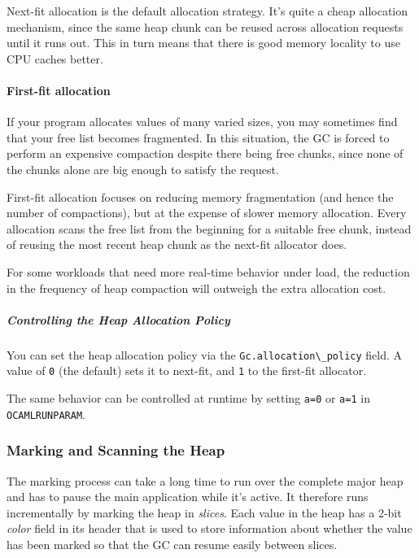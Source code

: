Next-fit allocation is the default allocation strategy. It's quite a
cheap allocation mechanism, since the same heap chunk can be reused
across allocation requests until it runs out. This in turn means that
there is good memory locality to use CPU caches better.

\hypertarget{first-fit-allocation}{%
\paragraph{First-fit allocation}\label{first-fit-allocation}}

If your program allocates values of many varied sizes, you may sometimes
find that your free list becomes fragmented. In this situation, the GC
is forced to perform an expensive compaction despite there being free
chunks, since none of the chunks alone are big enough to satisfy the
request.

First-fit allocation focuses on reducing memory fragmentation (and hence
the number of compactions), but at the expense of slower memory
allocation. Every allocation scans the free list from the beginning for
a suitable free chunk, instead of reusing the most recent heap chunk as
the next-fit allocator does. 

For some workloads that need more real-time behavior under load, the
reduction in the frequency of heap compaction will outweigh the extra
allocation cost.

\hypertarget{controlling-the-heap-allocation-policy}{%
\subparagraph{Controlling the Heap Allocation
Policy}\label{controlling-the-heap-allocation-policy}}

You can set the heap allocation policy via the
\passthrough{\lstinline!Gc.allocation\_policy!} field. A value of
\passthrough{\lstinline!0!} (the default) sets it to next-fit, and
\passthrough{\lstinline!1!} to the first-fit allocator.

The same behavior can be controlled at runtime by setting
\passthrough{\lstinline!a=0!} or \passthrough{\lstinline!a=1!} in
\passthrough{\lstinline!OCAMLRUNPARAM!}.

\hypertarget{marking-and-scanning-the-heap}{%
\subsubsection{Marking and Scanning the
Heap}\label{marking-and-scanning-the-heap}}

The marking process can take a long time to run over the complete major
heap and has to pause the main application while it's active. It
therefore runs incrementally by marking the heap in \emph{slices}. Each
value in the heap has a 2-bit \emph{color} field in its header that is
used to store information about whether the value has been marked so
that the GC can resume easily between slices.

